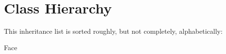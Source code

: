 \section{Class Hierarchy}
This inheritance list is sorted roughly, but not completely, alphabetically\+:\begin{DoxyCompactList}
\item Face\begin{DoxyCompactList}
\item {}
\end{DoxyCompactList}
\item {}
\item {}
\item {}
\end{DoxyCompactList}
